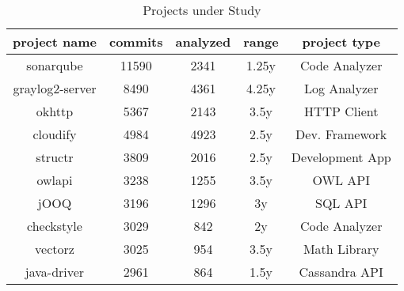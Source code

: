 \begin{table}
	\caption{Projects under Study}
	\label{tableProjects}
	\begin{center}
		\begin{tabular}{ | c | c | c | c | c | }
			\hline
			project name & commits & analyzed & range & project type \\
			\hline
			sonarqube & 11590 & 2341 & 1.25y & Code Analyzer \\
			graylog2-server & 8490 & 4361 & 4.25y & Log Analyzer \\
			okhttp & 5367 & 2143 & 3.5y & HTTP Client \\
			cloudify & 4984 & 4923 & 2.5y & Dev. Framework \\
			structr & 3809 & 2016 & 2.5y & Development App \\
			owlapi & 3238 & 1255 & 3.5y & OWL API \\
			jOOQ & 3196 & 1296 & 3y & SQL API \\
			checkstyle & 3029 & 842 & 2y & Code Analyzer \\
			vectorz & 3025 & 954 & 3.5y & Math Library \\
			java-driver & 2961 & 864 & 1.5y & Cassandra API \\
			\hline
		\end{tabular}
	\end{center}
\end{table}
